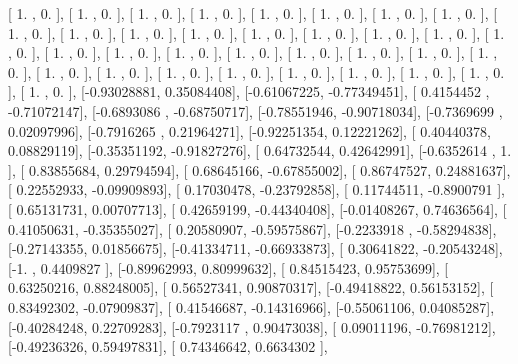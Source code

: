 \documentclass{article}
\begin{document}
       [ 1.        ,  0.        ],
       [ 1.        ,  0.        ],
       [ 1.        ,  0.        ],
       [ 1.        ,  0.        ],
       [ 1.        ,  0.        ],
       [ 1.        ,  0.        ],
       [ 1.        ,  0.        ],
       [ 1.        ,  0.        ],
       [ 1.        ,  0.        ],
       [ 1.        ,  0.        ],
       [ 1.        ,  0.        ],
       [ 1.        ,  0.        ],
       [ 1.        ,  0.        ],
       [ 1.        ,  0.        ],
       [ 1.        ,  0.        ],
       [ 1.        ,  0.        ],
       [ 1.        ,  0.        ],
       [ 1.        ,  0.        ],
       [ 1.        ,  0.        ],
       [ 1.        ,  0.        ],
       [ 1.        ,  0.        ],
       [ 1.        ,  0.        ],
       [ 1.        ,  0.        ],
       [ 1.        ,  0.        ],
       [ 1.        ,  0.        ],
       [ 1.        ,  0.        ],
       [ 1.        ,  0.        ],
       [ 1.        ,  0.        ],
       [ 1.        ,  0.        ],
       [ 1.        ,  0.        ],
       [ 1.        ,  0.        ],
       [ 1.        ,  0.        ],
       [ 1.        ,  0.        ],
       [ 1.        ,  0.        ],
       [-0.93028881,  0.35084408],
       [-0.61067225, -0.77349451],
       [ 0.4154452 , -0.71072147],
       [-0.6893086 , -0.68750717],
       [-0.78551946, -0.90718034],
       [-0.7369699 ,  0.02097996],
       [-0.7916265 ,  0.21964271],
       [-0.92251354,  0.12221262],
       [ 0.40440378,  0.08829119],
       [-0.35351192, -0.91827276],
       [ 0.64732544,  0.42642991],
       [-0.6352614 ,  1.        ],
       [ 0.83855684,  0.29794594],
       [ 0.68645166, -0.67855002],
       [ 0.86747527,  0.24881637],
       [ 0.22552933, -0.09909893],
       [ 0.17030478, -0.23792858],
       [ 0.11744511, -0.8900791 ],
       [ 0.65131731,  0.00707713],
       [ 0.42659199, -0.44340408],
       [-0.01408267,  0.74636564],
       [ 0.41050631, -0.35355027],
       [ 0.20580907, -0.59575867],
       [-0.2233918 , -0.58294838],
       [-0.27143355,  0.01856675],
       [-0.41334711, -0.66933873],
       [ 0.30641822, -0.20543248],
       [-1.        ,  0.4409827 ],
       [-0.89962993,  0.80999632],
       [ 0.84515423,  0.95753699],
       [ 0.63250216,  0.88248005],
       [ 0.56527341,  0.90870317],
       [-0.49418822,  0.56153152],
       [ 0.83492302, -0.07909837],
       [ 0.41546687, -0.14316966],
       [-0.55061106,  0.04085287],
       [-0.40284248,  0.22709283],
       [-0.7923117 ,  0.90473038],
       [ 0.09011196, -0.76981212],
       [-0.49236326,  0.59497831],
       [ 0.74346642,  0.6634302 ],
\end{document}

